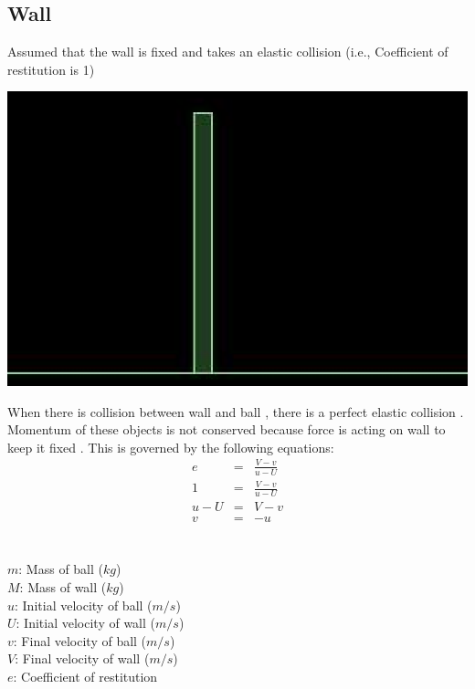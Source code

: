 \documentclass[11pt]{article}
\begin{document}
\subsection{Wall}
Assumed that the wall is fixed  and takes an elastic collision \cite{ref1} (i.e., Coefficient of restitution \cite{ref2} is 1)
\newline
\begin{center}
\includegraphics[scale=0.9]{wall}
\end{center}
 When there is collision between wall and ball , there is a perfect elastic collision . Momentum of these objects is not conserved because force is acting on wall to keep it fixed \cite{ref1}. This is governed by the following equations:
\begin{eqnarray}
e & = &\frac{V-v}{u-U}  \\
1 & = &\frac{V-v}{u-U} \nonumber  \label{eq:simp1} \\
u - U & = & V-v \nonumber  \label{eq:simp1} \\
 v & = & -u  \label{eq:simp1} 
\end{eqnarray}
\\
\\
$m$: Mass of ball ($kg$) \\
$M$: Mass of wall ($kg$) \\
$u$: Initial velocity of ball ($m/s$) \\ 
$U$: Initial velocity of wall ($m/s$) \\
$v$: Final velocity of ball ($m/s$) \\  
$V$: Final velocity of wall ($m/s$) \\
$e$: Coefficient of restitution \\ 
 
\end{document}
